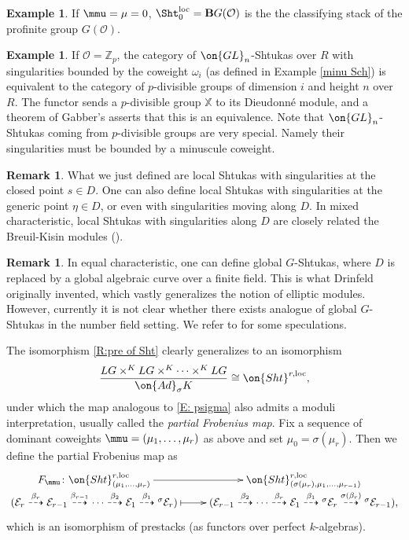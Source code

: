 \documentclass[11pt]{amsart}
\theoremstyle{definition}
\theoremstyle{definition}
\newtheorem{ex}[thm]{Example}
\newtheorem{rmk}[thm]{Remark}
\theoremstyle{definition}
\numberwithin{equation}{subsection}
\newcommand{\bX}{{\mathbb X}}
\newcommand{\bZ}{{\mathbb Z}}
\newcommand{\mE}{{\mathcal E}}
\newcommand{\mO}{{\mathcal O}}
\newcommand{\Ad}{{\on{Ad}}}
\newcommand{\loc}{\mathrm{loc}}
\newcommand{\GL}{{\on{GL}}}
\begin{document}
\begin{ex}\label{no singularity}
If $\mmu=\mu=0$, $\Sht^{\loc}_{0}=\mathbf B G(\mO)$ is the the classifying stack of the profinite group $G(\mO)$. 
\end{ex}

\begin{ex}\label{loc Sht and pdiv}
If $\mO=\bZ_p$, the category of $\GL_n$-Shtukas over $R$ with singularities bounded by the coweight $\omega_i$ (as defined in Example \ref{minu Sch}) is equivalent to the category of $p$-divisible groups of dimension $i$ and height $n$ over $R$. The functor sends a $p$-divisible group $\bX$ to its Dieudonn\'e module, and a theorem of Gabber's asserts that this is an equivalence. Note that  $\GL_n$-Shtukas coming from $p$-divisible groups are very special. Namely their singularities must be bounded by a minuscule coweight.
\end{ex}


\begin{rmk}
What we just defined are local Shtukas with singularities at the closed point $s\in D$. One can also define local Shtukas with singularities at the generic point $\eta\in D$, or even with singularities moving along $D$. 
In mixed characteristic, local Shtukas with singularities along $D$ are closely related the Breuil-Kisin modules (\cite{SW}).
\end{rmk}

\begin{rmk}
In equal characteristic, one can define global $G$-Shtukas, where $D$ is replaced by a global algebraic curve over a finite field. This is what Drinfeld originally invented, which vastly generalizes the notion of elliptic modules. However, currently it is not clear whether there exists analogue of global $G$-Shtukas in the number field setting. We refer to \cite{S} for some speculations.
\end{rmk}


The isomorphism \eqref{R:pre of Sht} clearly generalizes to an isomorphism 
$$\frac{LG\times^KLG\times^K\cdots\times^KLG}{\Ad_\sigma K}\cong \on{Sht}^{r,\loc},$$ under which the map analogous to \eqref{E: psigma} also admits a moduli interpretation, usually called the \emph{partial Frobenius map}.
Fix a sequence of dominant coweights $\mmu=(\mu_1,\ldots,\mu_r)$ as above and set $\mu_0=\sigma(\mu_r)$. Then we define the partial Frobenius map as
\begin{equation*}
\label{hpf}
\xymatrix@R=0pt{
F_\mmu\colon \on{Sht}_{(\mu_1,\ldots,\mu_r)}^{r,\loc} \ar[r] & \on{Sht}^{r,\loc}_{(\sigma(\mu_{r}),\mu_1,\ldots,\mu_{r-1})} \\ 
(\mE_r\stackrel{\beta_r}{\dashrightarrow} \mE_{r-1}\stackrel{\beta_{r-1}}{\dashrightarrow}\cdots\stackrel{\beta_2}{\dashrightarrow} \mE_1\stackrel{\beta_1}{\dashrightarrow} {^\sigma}\mE_r) \ar@{|->}[r] & (\mE_{r-1}\stackrel{\beta_2}{\dashrightarrow}\cdots\stackrel{\beta_r}{\dashrightarrow} \mE_1\stackrel{\beta_1}{\dashrightarrow} {^\sigma}\mE_r\stackrel{\sigma(\beta_r)}{\dashrightarrow} {^\sigma}\mE_{r-1}),
}
\end{equation*}
which is an isomorphism of prestacks (as functors over perfect $k$-algebras).
\end{document}
